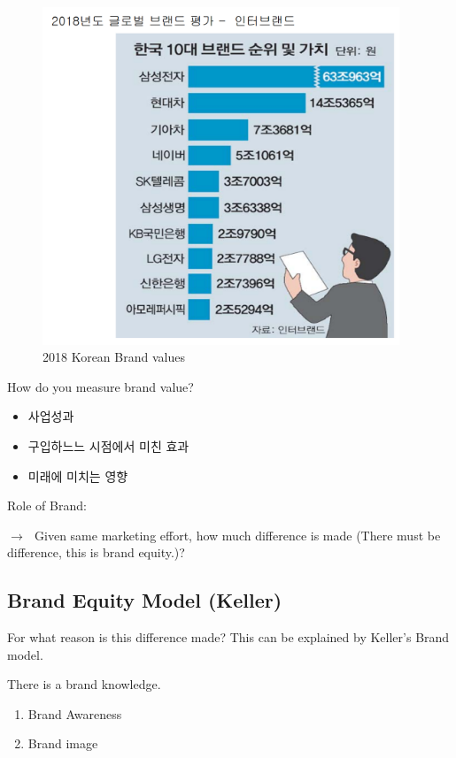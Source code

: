 \documentclass[12pt]{article}
\newcommand{\ra}{$\rightarrow \text{ }$}
\begin{document}
\begin{figure}[!htb]
	\centering
	\includegraphics[width=0.95\textwidth]{img/brandvalue.png}
	\caption{2018 Korean Brand values}
	\label{}
\end{figure}

How do you measure brand value?

\begin{itemize}
	\item 사업성과
	\item 구입하느느 시점에서 미친 효과
	\item 미래에 미치는 영향
\end{itemize}

Role of Brand:

\ra Given same marketing effort, how much difference is made (There must be difference, this is brand equity.)?


\subsection{Brand Equity Model (Keller)}

For what reason is this difference made? This can be explained by Keller's Brand model.

There is a brand knowledge.
\begin{enumerate}
	\item Brand Awareness
	\item Brand image
\end{enumerate}
\end{document}
